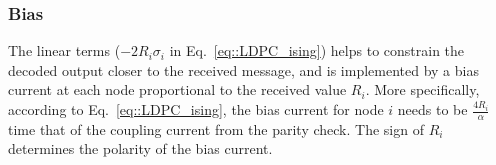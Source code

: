 


\subsubsection{\bf Bias}
The linear terms ($-2R_i\sigma_i$ in Eq.~\ref{eq::LDPC_ising}) helps to 
constrain the decoded output closer to the received message, and is implemented by a 
bias current at each node proportional to the received value $R_i$. 
More specifically, according to Eq.~\ref{eq::LDPC_ising}, the bias current for
node $i$ needs to be $\frac{4R_i}{\alpha}$ time that of the coupling current from
the parity check. The sign of $R_i$ determines the polarity of the bias current. 


